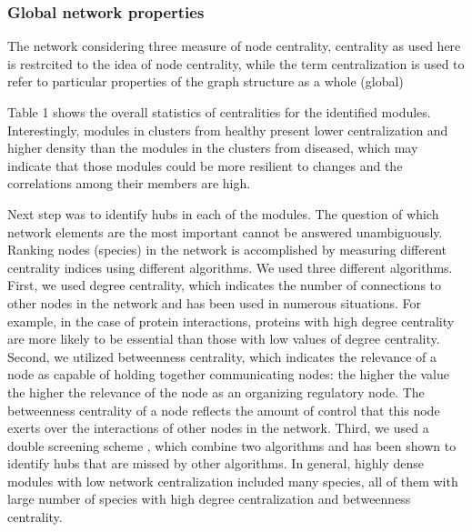 \subsubsection*{Global network properties}
The network considering three measure of node centrality, centrality as used here is restrcited to the idea of node centrality, while the term centralization is used to refer to particular properties of the graph structure as a whole (global)


Table 1 shows the overall statistics of centralities for the identified modules. Interestingly, modules in clusters from healthy  present lower centralization and higher density than the modules in the clusters from diseased, which may indicate that those modules could be more resilient to changes and the correlations among their members are high.

Next step was to identify hubs in each of the modules. The question of which network elements are the most important cannot be answered unambiguously. Ranking nodes (species) in the network is accomplished by measuring different centrality indices using different algorithms. We used three different algorithms. First, we used degree centrality, which indicates the number of connections to other nodes in the network and has been used in numerous situations. For example, in the case of protein interactions, proteins with high degree centrality are more likely to be essential than those with low values of degree centrality. Second, we utilized betweenness centrality, which indicates the relevance of a node as capable of holding together communicating nodes: the higher the value the higher the relevance of the node as an organizing regulatory node. The betweenness centrality of a node reflects the amount of control that this node exerts over the interactions of other nodes in the network. Third, we used a double screening scheme , which combine two algorithms  and has been shown to identify hubs that are missed by other algorithms. In general, highly dense modules with low network centralization included many species, all of them with large number of species with high degree centralization and betweenness centrality.
